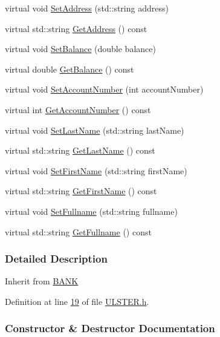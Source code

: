 \begin{DoxyCompactItemize}
virtual void \hyperlink{class_u_l_s_t_e_r_a5b0662f0524ce8ce710881a05b431fad}{Set\+Address} (std\+::string address)
\item 
virtual std\+::string \hyperlink{class_u_l_s_t_e_r_ac31a16a960e53ea592b0d809a3ba167d}{Get\+Address} () const 
\item 
virtual void \hyperlink{class_u_l_s_t_e_r_a288ded3e96cf65a066f13529db94b182}{Set\+Balance} (double balance)
\item 
virtual double \hyperlink{class_u_l_s_t_e_r_ae70da9686ac038862900182a984e56eb}{Get\+Balance} () const 
\item 
virtual void \hyperlink{class_u_l_s_t_e_r_ae28bbc54174cd9b3b268d827c122c412}{Set\+Account\+Number} (int account\+Number)
\item 
virtual int \hyperlink{class_u_l_s_t_e_r_a1ad672ae865a9f559bf4d3c33c243d63}{Get\+Account\+Number} () const 
\item 
virtual void \hyperlink{class_u_l_s_t_e_r_ab2fec6b440c29b1953296ad23d4b432c}{Set\+Last\+Name} (std\+::string last\+Name)
\item 
virtual std\+::string \hyperlink{class_u_l_s_t_e_r_a9320b012bccda4ebf6b41c9ed972743c}{Get\+Last\+Name} () const 
\item 
virtual void \hyperlink{class_u_l_s_t_e_r_a07b57449397c42be1c2b512851dceebd}{Set\+First\+Name} (std\+::string first\+Name)
\item 
virtual std\+::string \hyperlink{class_u_l_s_t_e_r_a85ee4e42d9b309608d8dfbedac65ff27}{Get\+First\+Name} () const 
\item 
virtual void \hyperlink{class_u_l_s_t_e_r_a38d245bc2b6bb14bbb39c3347766140d}{Set\+Fullname} (std\+::string fullname)
\item 
virtual std\+::string \hyperlink{class_u_l_s_t_e_r_abb93ac2163f908782d00cbae169ebb91}{Get\+Fullname} () const 
\end{DoxyCompactItemize}


\subsubsection{Detailed Description}
Inherit from \hyperlink{class_b_a_n_k}{B\+A\+NK} 

Definition at line \hyperlink{_u_l_s_t_e_r_8h_source_l00019}{19} of file \hyperlink{_u_l_s_t_e_r_8h_source}{U\+L\+S\+T\+E\+R.\+h}.



\subsubsection{Constructor \& Destructor Documentation}
